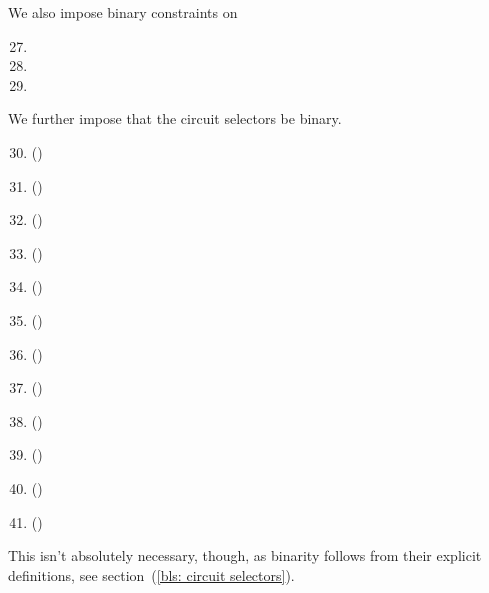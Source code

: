 \noindent We also impose binary constraints on
\begin{multicols}{2}
    \begin{enumerate}
        \setcounter{enumi}{26}
        \item \isFirstInput
        \item \isSecondInput
        \item \wcpFlag
    \end{enumerate} 
\end{multicols}
\noindent We further impose that the circuit selectors be binary.
\begin{multicols}{2}
    \begin{enumerate}
        \setcounter{enumi}{29}
    \item \csPointEvaluation{} (\sanityCheck)
    \item \csCOne{}            (\sanityCheck)
    \item \csGOne{}            (\sanityCheck)
    \item \csCTwo{}            (\sanityCheck)
    \item \csGTwo{}            (\sanityCheck)
    \item \csPairing{}         (\sanityCheck)
    \item \csGOneAdd{}         (\sanityCheck)
    \item \csGTwoAdd{}         (\sanityCheck)
    \item \csGOneMsm{}         (\sanityCheck)
    \item \csGTwoMsm{}         (\sanityCheck)
    \item \csMapFpToGOne{}     (\sanityCheck)
    \item \csMapFpTwoToGTwo{}  (\sanityCheck)
    \end{enumerate}
\end{multicols}
\saNote{}
This isn't absolutely necessary,
though, as binarity follows from their explicit definitions,
see section~(\ref{bls: circuit selectors}).
